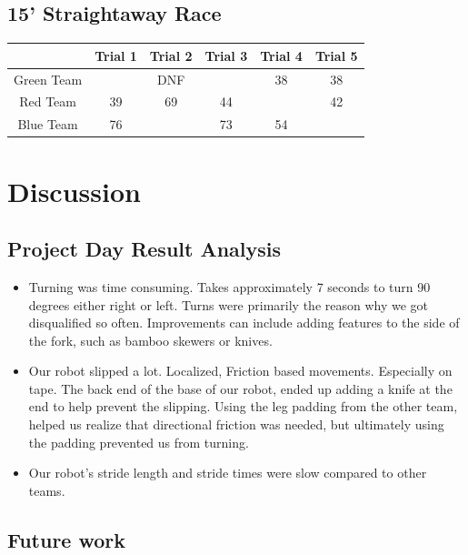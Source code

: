 \documentclass[a4paper, 12pt, oneside]{article} %
\begin{document}
\subsection{15’ Straightaway Race}
\begin{table}[htbp]
	\centering
	\begin{tabular}{c|ccccc}
		&Trial 1 &Trial 2 &Trial 3 &Trial 4& Trial 5\\
		\hline 
		Green Team&&DNF&&38&38\\
		Red Team&39&69&44&&42\\
		Blue Team& 76&&73&54&\\
	\end{tabular}
\end{table}
\section{Discussion}

\subsection{Project Day Result Analysis}
\begin{itemize}
	\item Turning was time consuming. Takes approximately 7 seconds to turn 90 degrees either right or left. Turns were primarily the reason why we got disqualified so often. Improvements can include adding features to the side of the fork, such as bamboo skewers or knives. 
	\item Our robot slipped a lot. Localized, Friction based movements. Especially on tape. The back end of the base of our robot, ended up adding a knife at the end to help prevent the slipping. Using the leg padding from the other team, helped us realize that directional friction was needed, but ultimately using the padding prevented us from turning.
	\item Our robot’s stride length and stride times were slow compared to other teams. 
\end{itemize}
\subsection{Future work}
\end{document}
